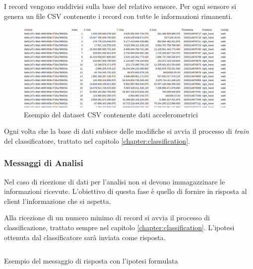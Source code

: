 \vspace{5mm} %
I record vengono suddivisi sulla base del relativo sensore. Per ogni sensore si genera un file CSV contenente i record con tutte 
le informazioni rimanenti.

\begin{figure}[H]
    \centering
    \includegraphics[scale = 0.39]{assets/images/examples/dataset-data-example.png}
    \caption{Esempio del dataset CSV contenente dati accelerometrici}
    \label{fig:example-dataset-csv-accelerometer}
\end{figure}

Ogni volta che la base di dati subisce delle modifiche si avvia il processo di \textit{train} del classificatore, 
trattato nel capitolo \ref{chapter:classification}.


\subsubsection{Messaggi di Analisi}
Nel caso di ricezione di dati per l'analisi non si devono immagazzinare le informazioni ricevute. 
L'obiettivo di questa fase è quello di fornire in risposta al client l'informazione che si aspetta.

Alla ricezione di un numero minimo di record si avvia il processo di classificazione, trattato sempre nel capitolo \ref{chapter:classification}.
L'ipotesi ottenuta dal classificatore sarà inviata come risposta.
\vfill
\begin{listing}[H] 
    \inputminted[frame=single,framesep=10pt]{json}{assets/snippets/server/receiver/prediction.json}
    \caption{Esempio del messaggio di risposta con l'ipotesi formulata}
    \label{listing:example-message-prediction}
\end{listing}
